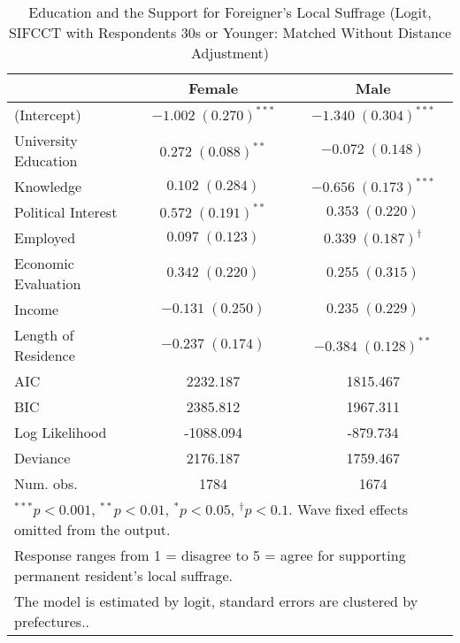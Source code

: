 
\begin{table}
\caption{Education and the Support for Foreigner's Local Suffrage (Logit, SIFCCT with Respondents 30s or Younger: Matched Without Distance Adjustment)}
\begin{center}
\begin{tabular}{l c c }
\toprule
 & Female & Male \\
\midrule
(Intercept)          & $-1.002 \; (0.270)^{***}$ & $-1.340 \; (0.304)^{***}$    \\
University Education & $0.272 \; (0.088)^{**}$   & $-0.072 \; (0.148)$          \\
Knowledge            & $0.102 \; (0.284)$        & $-0.656 \; (0.173)^{***}$    \\
Political Interest   & $0.572 \; (0.191)^{**}$   & $0.353 \; (0.220)$           \\
Employed             & $0.097 \; (0.123)$        & $0.339 \; (0.187)^{\dagger}$ \\
Economic Evaluation  & $0.342 \; (0.220)$        & $0.255 \; (0.315)$           \\
Income               & $-0.131 \; (0.250)$       & $0.235 \; (0.229)$           \\
Length of Residence  & $-0.237 \; (0.174)$       & $-0.384 \; (0.128)^{**}$     \\
\midrule
AIC                  & 2232.187                  & 1815.467                     \\
BIC                  & 2385.812                  & 1967.311                     \\
Log Likelihood       & -1088.094                 & -879.734                     \\
Deviance             & 2176.187                  & 1759.467                     \\
Num. obs.            & 1784                      & 1674                         \\
\bottomrule
\multicolumn{3}{l}{\scriptsize{$^{***}p<0.001$, $^{**}p<0.01$, $^*p<0.05$, $^{\dagger}p<0.1$. Wave fixed effects omitted from the output.}} \\ \multicolumn{3}{l}{\scriptsize{Response ranges from 1 = disagree to 5 = agree for supporting permanent resident's local suffrage.}} \\ \multicolumn{3}{l}{\scriptsize{The model is estimated by logit, standard errors are clustered by prefectures..}}
\end{tabular}
\label{lgtab_smo_m1}
\end{center}
\end{table}

